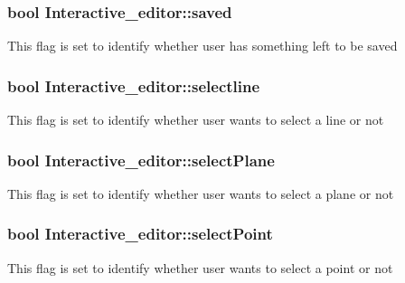 \subsubsection[{\texorpdfstring{saved}{saved}}]{\setlength{\rightskip}{0pt plus 5cm}bool Interactive\+\_\+editor\+::saved}\hypertarget{classInteractive__editor_a2e6cd28cc09c6250bb5aa720acfc16a4}{}\label{classInteractive__editor_a2e6cd28cc09c6250bb5aa720acfc16a4}
This flag is set to identify whether user has something left to be saved 
\subsubsection[{\texorpdfstring{selectline}{selectline}}]{\setlength{\rightskip}{0pt plus 5cm}bool Interactive\+\_\+editor\+::selectline}\hypertarget{classInteractive__editor_ad2e77097ff1ba602c3cdca2905febea7}{}\label{classInteractive__editor_ad2e77097ff1ba602c3cdca2905febea7}
This flag is set to identify whether user wants to select a line or not 
\subsubsection[{\texorpdfstring{select\+Plane}{selectPlane}}]{\setlength{\rightskip}{0pt plus 5cm}bool Interactive\+\_\+editor\+::select\+Plane}\hypertarget{classInteractive__editor_a9da61abe038ee33f9d15ef4a028dc8ab}{}\label{classInteractive__editor_a9da61abe038ee33f9d15ef4a028dc8ab}
This flag is set to identify whether user wants to select a plane or not 
\subsubsection[{\texorpdfstring{select\+Point}{selectPoint}}]{\setlength{\rightskip}{0pt plus 5cm}bool Interactive\+\_\+editor\+::select\+Point}\hypertarget{classInteractive__editor_ab0f07759c3ff1bcfe45d0c285abe29b5}{}\label{classInteractive__editor_ab0f07759c3ff1bcfe45d0c285abe29b5}
This flag is set to identify whether user wants to select a point or not 
